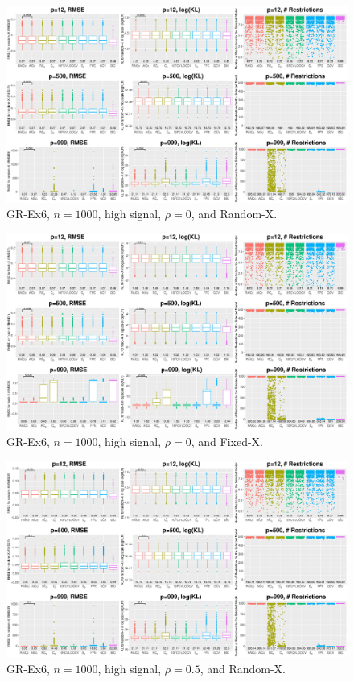 \clearpage
\begin{figure}[!ht]
\centering
\includegraphics[width=\textwidth]{figures/supplement/randomx_GR-Ex6_n1000_hsnr_rho0.eps}
\caption{GR-Ex6, $n=1000$, high signal, $\rho=0$, and Random-X.}
\end{figure}
\begin{figure}[!ht]
\centering
\includegraphics[width=\textwidth]{figures/supplement/fixedx_GR-Ex6_n1000_hsnr_rho0.eps}
\caption{GR-Ex6, $n=1000$, high signal, $\rho=0$, and Fixed-X.}
\end{figure}
\clearpage
\begin{figure}[!ht]
\centering
\includegraphics[width=\textwidth]{figures/supplement/randomx_GR-Ex6_n1000_hsnr_rho05.eps}
\caption{GR-Ex6, $n=1000$, high signal, $\rho=0.5$, and Random-X.}
\end{figure}
